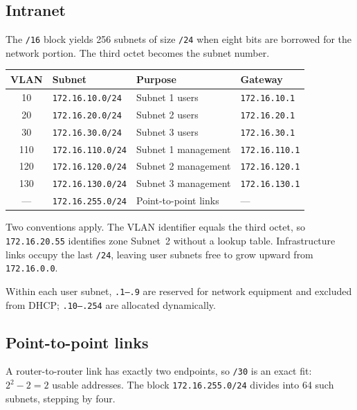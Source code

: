 \documentclass[12pt,a4paper]{article}
\begin{document}
\subsection{Intranet}

The \texttt{/16} block yields 256 subnets of size \texttt{/24} when eight bits
are borrowed for the network portion. The third octet becomes the subnet number.

\begin{table}[H]
\centering
\begin{tabular}{@{} c l l l @{}}
\toprule
\textbf{VLAN} & \textbf{Subnet} & \textbf{Purpose} & \textbf{Gateway} \\
\midrule
10  & \texttt{172.16.10.0/24}  & Subnet 1 users      & \texttt{172.16.10.1} \\
20  & \texttt{172.16.20.0/24}  & Subnet 2 users      & \texttt{172.16.20.1} \\
30  & \texttt{172.16.30.0/24}  & Subnet 3 users      & \texttt{172.16.30.1} \\
110 & \texttt{172.16.110.0/24} & Subnet 1 management & \texttt{172.16.110.1} \\
120 & \texttt{172.16.120.0/24} & Subnet 2 management & \texttt{172.16.120.1} \\
130 & \texttt{172.16.130.0/24} & Subnet 3 management & \texttt{172.16.130.1} \\
--- & \texttt{172.16.255.0/24} & Point-to-point links & --- \\
\bottomrule
\end{tabular}
\end{table}

Two conventions apply. The VLAN identifier equals the third octet, so
\texttt{172.16.20.55} identifies zone Subnet~2 without a lookup table.
Infrastructure links occupy the last \texttt{/24}, leaving user subnets free to
grow upward from \texttt{172.16.0.0}.

Within each user subnet, \texttt{.1--.9} are reserved for network equipment and
excluded from DHCP; \texttt{.10--.254} are allocated dynamically.

\subsection{Point-to-point links}

A router-to-router link has exactly two endpoints, so \texttt{/30} is an exact
fit: $2^2 - 2 = 2$ usable addresses. The block \texttt{172.16.255.0/24} divides
into 64 such subnets, stepping by four.
\end{document}
